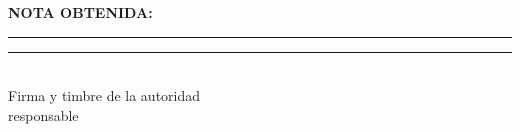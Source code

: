 
\clearpage  %
\thispagestyle{fancy}

\vspace*{2cm}

\begin{flushright}
    {\large\textbf{NOTA OBTENIDA:}}
    
    \vspace{2cm}
    
    \rule{4cm}{0.4pt}
    
    \vspace{3cm}
    
    \rule{6cm}{0.4pt}\\
    Firma y timbre de la autoridad\\
    responsable
\end{flushright}

\vfill

\newpage
